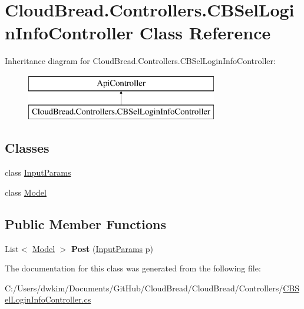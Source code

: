 \hypertarget{class_cloud_bread_1_1_controllers_1_1_c_b_sel_login_info_controller}{}\section{Cloud\+Bread.\+Controllers.\+C\+B\+Sel\+Login\+Info\+Controller Class Reference}
\label{class_cloud_bread_1_1_controllers_1_1_c_b_sel_login_info_controller}
Inheritance diagram for Cloud\+Bread.\+Controllers.\+C\+B\+Sel\+Login\+Info\+Controller\+:\begin{figure}[H]
\begin{center}
\leavevmode
\includegraphics[height=2.000000cm]{class_cloud_bread_1_1_controllers_1_1_c_b_sel_login_info_controller}
\end{center}
\end{figure}
\subsection*{Classes}
\begin{DoxyCompactItemize}
\item 
class \hyperlink{class_cloud_bread_1_1_controllers_1_1_c_b_sel_login_info_controller_1_1_input_params}{Input\+Params}
\item 
class \hyperlink{class_cloud_bread_1_1_controllers_1_1_c_b_sel_login_info_controller_1_1_model}{Model}
\end{DoxyCompactItemize}
\subsection*{Public Member Functions}
\begin{DoxyCompactItemize}
\item 
List$<$ \hyperlink{class_cloud_bread_1_1_controllers_1_1_c_b_sel_login_info_controller_1_1_model}{Model} $>$ {\bfseries Post} (\hyperlink{class_cloud_bread_1_1_controllers_1_1_c_b_sel_login_info_controller_1_1_input_params}{Input\+Params} p)\hypertarget{class_cloud_bread_1_1_controllers_1_1_c_b_sel_login_info_controller_ae6dca0c99340f8f6583f2726966e8da2}{}\label{class_cloud_bread_1_1_controllers_1_1_c_b_sel_login_info_controller_ae6dca0c99340f8f6583f2726966e8da2}

\end{DoxyCompactItemize}


The documentation for this class was generated from the following file\+:\begin{DoxyCompactItemize}
\item 
C\+:/\+Users/dwkim/\+Documents/\+Git\+Hub/\+Cloud\+Bread/\+Cloud\+Bread/\+Controllers/\hyperlink{_c_b_sel_login_info_controller_8cs}{C\+B\+Sel\+Login\+Info\+Controller.\+cs}\end{DoxyCompactItemize}
